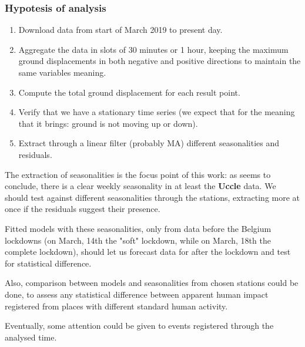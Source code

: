 \documentclass[12pt]{article}
\begin{document}
\subsubsection*{Hypotesis of analysis}

\begin{enumerate}
	\item Download data from start of March 2019 to present day.
	\item Aggregate the data in slots of 30 minutes or 1 hour, keeping the maximum ground displacements in both negative and positive directions to maintain the same variables meaning.
	\item Compute the total ground displacement for each result point.
	\item Verify that we have a stationary time series (we expect that for the meaning that it brings: ground is not moving up or down).
	\item Extract through a linear filter (probably MA) different seasonalities and residuals.
\end{enumerate}

The extraction of seasonalities is the focus point of this work: as \cite{NatureCoronavirusSeismic} seems to conclude, there is a clear weekly seasonality in at least the \textbf{Uccle} data. We should test against different seasonalities through the stations, extracting more at once if the residuals suggest their presence.

Fitted models with these seasonalities, only from data before the Belgium lockdowns (on March, 14th the "soft" lockdown, while on March, 18th the complete lockdown), should let us forecast data for after the lockdown and test for statistical difference.

Also, comparison between models and seasonalities from chosen stations could be done, to assess any statistical difference between apparent human impact registered from places with different standard human activity.

Eventually, some attention could be given to events registered through the analysed time.











\newpage

\end{document}
